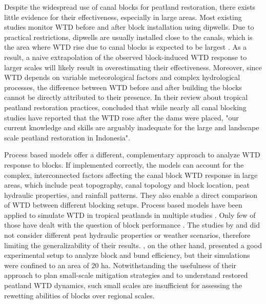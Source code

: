 \documentclass[bg, manuscript]{copernicus}
\begin{document}
Despite the widespread use of canal blocks for peatland restoration, there exists little evidence for their effectiveness, especially   in large areas.
Most existing studies monitor WTD before and after block installation using dipwells.
Due to practical restrictions, dipwells are usually installed close to the canals, which is the area where WTD rise due to canal blocks is expected to be largest \citep{sutiknoWaterManagementHydrological2020, kasihRewettingDegradedTropical2016, ritzemaCanalBlockingStrategies2014}.
As a result, a naive extrapolation of the observed  block-induced WTD response to larger scales will likely result in overestimating their effectiveness.
Moreover, since WTD depends on variable meteorological factors and complex hydrological processes, the difference between WTD before and after building the blocks cannot be directly attributed to their presence.
In their review about tropical peatland restoration practices, \cite{dohongReviewTechniquesEffective2018} concluded that while nearly all canal blocking studies have reported that the WTD rose after the dams were placed, "our current knowledge and skills are arguably inadequate for the large and landscape scale peatland restoration in Indonesia".

Process based models offer a different, complementary approach to analyze WTD response to blocks.
If implemented correctly, the models can account for the complex, interconnected factors affecting the canal block WTD response in large areas, which include peat topography, canal topology and block location, peat hydraulic properties, and  rainfall patterns.
They also enable a direct comparison of WTD between different blocking setups.
Process based models have been applied to simulate WTD in tropical peatlands in multiple studies \citep{wostenTropicalPeatlandWater2006, cobbHowTemporalPatterns2017, bairdHighPermeabilityExplains2017, urzainkiCanalBlockingOptimization2020}.
Only few of those have dealt with the question of block performance  \citep{jaenickePlanningHydrologicalRestoration2010, ishiiGroundwaterPeatland2016, putraModellingPerformanceBunds2022}.
The studies by \cite{ishiiGroundwaterPeatland2016} and \cite{jaenickePlanningHydrologicalRestoration2010} did not consider different peat hydraulic properties or weather scenarios, therefore limiting the generalizability of their results.
\cite{putraModellingPerformanceBunds2022}, on the other hand, presented a good experimental setup to analyze block and bund efficiency, but their simulations were confined to an area of $20$ \unit{ha}.
Notwithstanding the usefulness of their approach to plan small-scale mitigation strategies and to understand restored peatland WTD dynamics, such small scales are insufficient for assessing the rewetting abilities of blocks over regional scales.
\end{document}
